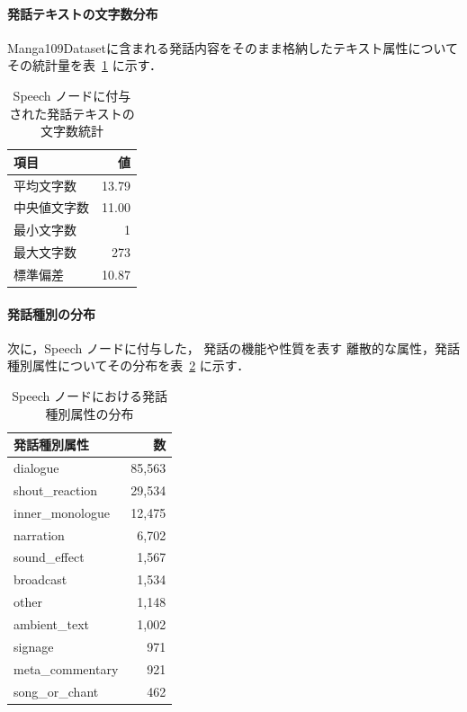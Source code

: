 \documentclass[a4j,12pt,dvipdfmx]{jsreport}
\begin{document}
\paragraph{発話テキストの文字数分布}
Manga109Datasetに含まれる発話内容をそのまま格納したテキスト属性についてその統計量を表~\ref{tab:speech_text_stats} に示す．

\begin{table}[htbp]
   \centering
   \caption{Speech ノードに付与された発話テキストの文字数統計}
   \label{tab:speech_text_stats}
   \begin{tabular}{lr}
      \toprule
      項目     & 値     \\
      \midrule
      平均文字数  & 13.79 \\
      中央値文字数 & 11.00 \\
      最小文字数  & 1     \\
      最大文字数  & 273   \\
      標準偏差   & 10.87 \\
      \bottomrule
   \end{tabular}
\end{table}

\paragraph{発話種別の分布}
次に，Speech ノードに付与した，
発話の機能や性質を表す
離散的な属性，発話種別属性についてその分布を表~\ref{tab:speech_type_enum_stats} に示す．

\begin{table}[htbp]
   \centering
   \caption{Speech ノードにおける発話種別属性の分布}
   \label{tab:speech_type_enum_stats}
   \begin{tabular}{lr}
      \toprule
      発話種別属性           & 数        \\
      \midrule
      dialogue         & 85{,}563 \\
      shout\_reaction  & 29{,}534 \\
      inner\_monologue & 12{,}475 \\
      narration        & 6{,}702  \\
      sound\_effect    & 1{,}567  \\
      broadcast        & 1{,}534  \\
      other            & 1{,}148  \\
      ambient\_text    & 1{,}002  \\
      signage          & 971      \\
      meta\_commentary & 921      \\
      song\_or\_chant  & 462      \\
      \bottomrule
   \end{tabular}
\end{table}
\end{document}
